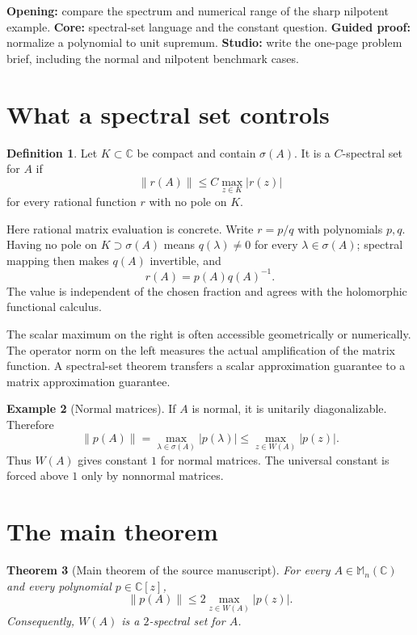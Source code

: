 \documentclass[11pt,oneside,openany]{book}
\newtheorem{theorem}{Theorem}[chapter]
\theoremstyle{definition}
\newtheorem{definition}[theorem]{Definition}
\newtheorem{example}[theorem]{Example}
\theoremstyle{remark}
\newcommand{\C}{\mathbb C}
\newcommand{\Mn}{\mathbb M_n(\C)}
\newcommand{\spec}{\sigma}
\newcommand{\norm}[1]{\left\lVert #1\right\rVert}
\begin{document}
\begin{workshopplan}
\textbf{Opening:} compare the spectrum and numerical range of the
sharp nilpotent example. \textbf{Core:} spectral-set language and the
constant question. \textbf{Guided proof:} normalize a polynomial to
unit supremum. \textbf{Studio:} write the one-page problem brief,
including the normal and nilpotent benchmark cases.
\end{workshopplan}

\section{What a spectral set controls}

\begin{definition}
Let \(K\subset\C\) be compact and contain \(\spec(A)\).  It is a
\(C\)-spectral set for \(A\) if
\[
  \norm{r(A)}
  \leq C\max_{z\in K}|r(z)|
\]
for every rational function \(r\) with no pole on \(K\).
\end{definition}

Here rational matrix evaluation is concrete.  Write \(r=p/q\) with
polynomials \(p,q\).  Having no pole on \(K\supset\spec(A)\) means
\(q(\lambda)\neq0\) for every \(\lambda\in\spec(A)\); spectral mapping
then makes \(q(A)\) invertible, and
\[
  r(A)=p(A)q(A)^{-1}.
\]
The value is independent of the chosen fraction and agrees with the
holomorphic functional calculus.

The scalar maximum on the right is often accessible geometrically or
numerically.  The operator norm on the left measures the actual
amplification of the matrix function.  A spectral-set theorem transfers
a scalar approximation guarantee to a matrix approximation guarantee.

\begin{example}[Normal matrices]
If \(A\) is normal, it is unitarily diagonalizable.  Therefore
\[
  \norm{p(A)}
  =\max_{\lambda\in\spec(A)}|p(\lambda)|
  \leq\max_{z\in W(A)}|p(z)|.
\]
Thus \(W(A)\) gives constant \(1\) for normal matrices.  The universal
constant is forced above \(1\) only by nonnormal matrices.
\end{example}

\section{The main theorem}

\begin{theorem}[Main theorem of the source manuscript]
\label{thm:main}
For every \(A\in\Mn\) and every polynomial \(p\in\C[z]\),
\begin{equation}
  \norm{p(A)}
  \leq2\max_{z\in W(A)}|p(z)|.
  \label{eq:main}
\end{equation}
Consequently, \(W(A)\) is a \(2\)-spectral set for \(A\).
\end{theorem}
\end{document}
